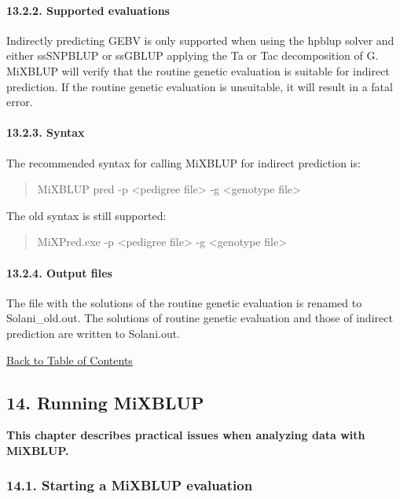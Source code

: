 \paragraph{13.2.2. Supported evaluations}\label{Indi05}

Indirectly predicting GEBV is only supported when using the hpblup
solver and either ssSNPBLUP or ssGBLUP applying the Ta or Tac
decomposition of G. MiXBLUP will verify that the routine genetic
evaluation is suitable for indirect prediction. If the routine genetic
evaluation is unsuitable, it will result in a fatal error.

\paragraph{13.2.3. Syntax}\label{Indi06}

The recommended syntax for calling MiXBLUP for indirect prediction is:

\begin{quote}
MiXBLUP pred -p \textless pedigree file\textgreater{} -g
\textless genotype file\textgreater{}
\end{quote}

The old syntax is still supported:

\begin{quote}
MiXPred.exe -p \textless pedigree file\textgreater{} -g
\textless genotype file\textgreater{}
\end{quote}

\paragraph{13.2.4. Output files}\label{Indi07}

The file with the solutions of the routine genetic evaluation is renamed
to Solani\_old.out. The solutions of routine genetic evaluation and
those of indirect prediction are written to Solani.out.

\hyperref[Tabl01]{Back to Table of Contents}

\newpage

\subsection{14. Running MiXBLUP}\label{Runn01}

\textbf{This chapter describes practical issues when analyzing data with
MiXBLUP.}

\subsubsection{14.1. Starting a MiXBLUP evaluation}\label{Runn02}

